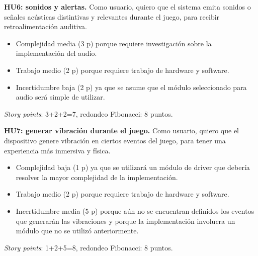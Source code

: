 \documentclass[
11pt, %
]{charter}
\begin{document}

	\textbf{HU6: sonidos y alertas.} Como usuario, quiero que el sistema emita sonidos o señales acústicas distintivas y relevantes durante el juego, para recibir retroalimentación auditiva.

	\begin{itemize}
		\item Complejidad media (3 p) porque requiere investigación sobre la implementación del audio.
		\item Trabajo medio (2 p) porque requiere trabajo de hardware y software. 
		\item Incertidumbre baja (2 p) ya que se asume que el módulo seleccionado para audio será simple de utilizar. 
	\end{itemize}
	\textit{Story points}: 3+2+2=7, redondeo Fibonacci: 8 puntos.
		
	\textbf{HU7: generar vibración durante el juego.} Como usuario, quiero que el dispositivo genere vibración en ciertos eventos del juego, para tener una experiencia más inmersiva y física.

	\begin{itemize}
		\item Complejidad baja (1 p) ya que se utilizará un módulo de driver que debería resolver la mayor complejidad de la implementación.
		\item Trabajo medio (2 p) porque requiere trabajo de hardware y software. 
		\item Incertidumbre media (5 p) porque aún no se encuentran definidos los eventos que generarán las vibraciones y porque la implementación involucra un módulo que no se utilizó anteriormente. 
	\end{itemize}
	\textit{Story points}: 1+2+5=8, redondeo Fibonacci: 8 puntos.
		
\end{document}
